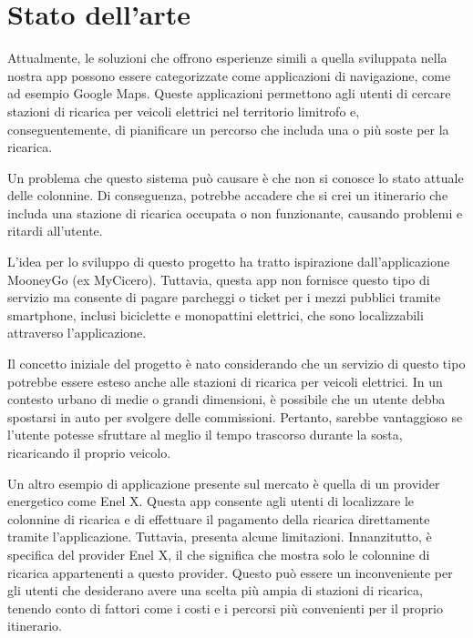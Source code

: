 

\section{Stato dell'arte}

Attualmente, le soluzioni che offrono esperienze simili a quella sviluppata nella nostra app possono essere categorizzate
come applicazioni di navigazione, come ad esempio Google Maps.
Queste applicazioni permettono agli utenti di cercare stazioni di ricarica per veicoli elettrici nel territorio
limitrofo e, conseguentemente, di pianificare un percorso che includa una o più soste per la ricarica.

Un problema che questo sistema può causare è che non si conosce lo stato attuale delle colonnine. Di conseguenza,
potrebbe accadere che si crei un itinerario che includa una stazione di ricarica occupata o non funzionante, causando problemi e ritardi all'utente.

L'idea per lo sviluppo di questo progetto ha tratto ispirazione dall'applicazione MooneyGo (ex MyCicero). Tuttavia,
questa app non fornisce questo tipo di servizio ma consente di pagare parcheggi o ticket per i mezzi pubblici
tramite smartphone, inclusi biciclette e monopattini elettrici, che sono localizzabili attraverso l'applicazione.

Il concetto iniziale del progetto è nato considerando che un servizio di questo tipo potrebbe essere esteso anche
alle stazioni di ricarica per veicoli elettrici. In un contesto urbano di medie o grandi dimensioni, è possibile
che un utente debba spostarsi in auto per svolgere delle commissioni. Pertanto, sarebbe vantaggioso se l'utente
potesse sfruttare al meglio il tempo trascorso durante la sosta, ricaricando il proprio veicolo.


Un altro esempio di applicazione presente sul mercato è quella di un provider energetico come Enel X. Questa app consente agli utenti di localizzare le colonnine di ricarica e di effettuare il pagamento della ricarica direttamente tramite l'applicazione. Tuttavia, presenta alcune limitazioni. Innanzitutto, è specifica del provider Enel X, il che significa che mostra solo le colonnine di ricarica appartenenti a questo provider. Questo può essere un inconveniente per gli utenti che desiderano avere una scelta più ampia di stazioni di ricarica, tenendo conto di fattori come i costi e i percorsi più convenienti per il proprio itinerario.

